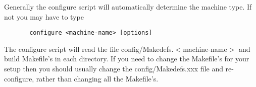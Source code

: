 \documentclass{article}
\begin{document}
Generally the configure script will automatically determine the machine type. If not you may have
to type
\begin{verbatim}
       configure <machine-name> [options]
\end{verbatim}
The configure script will read the file config/Makedefs.$<$machine-name$>$
and build Makefile's in each directory. If you need to change the Makefile's for your setup
then you should usually change the config/Makedefs.xxx file and re-configure, rather than changing all the
Makefile's.



% 
\end{document}
